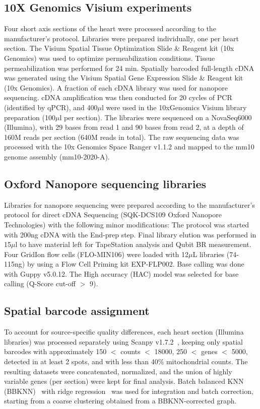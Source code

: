 \documentclass[utf8]{FrontiersinHarvard} %
\begin{document}
\subsection*{10X Genomics Visium experiments}
Four short axis sections of the heart were processed according to the manufacturer's protocol. Libraries were prepared individually, one per heart section. The Visium Spatial Tissue Optimization Slide \& Reagent kit (10x Genomics) was used to optimize permeabilization conditions. Tissue permeabilization was performed for 24 min. Spatially barcoded full-length cDNA was generated using the Visium Spatial Gene Expression Slide \& Reagent kit (10x Genomics). A fraction of each cDNA library was used for nanopore sequencing. cDNA amplification was then conducted for 20 cycles of PCR (identified by qPCR), and 400$\mu$l were used in the 10xGenomics Visium library preparation (100$\mu$l per section). The libraries were sequenced on a NovaSeq6000 (Illumina), with 29 bases from read 1 and 90 bases from read 2, at a depth of 160M reads per section (640M reads in total). The raw sequencing data was processed with the 10x Genomics Space Ranger v1.1.2 and mapped to the mm10 genome assembly (mm10-2020-A).

\subsection*{Oxford Nanopore sequencing libraries}
Libraries for nanopore sequencing were prepared according to the manufacturer's protocol for direct cDNA Sequencing (SQK-DCS109 Oxford Nanopore Technologies) with the following minor modifications: The protocol was started with 200ng cDNA with the End-prep step. Final library elution was performed in 15$\mu$l to have material left for TapeStation analysis and Qubit BR measurement. Four GridIon flow cells (FLO-MIN106) were loaded with 12$\mu$L libraries (74-115ng) by using a Flow Cell Priming kit EXP-FLP002. Base calling was done with Guppy v5.0.12. The High accuracy (HAC) model was selected for base calling (Q-Score cut-off $>$ 9).

\subsection*{Spatial barcode assignment}
To account for source-specific quality differences, each heart section (Illumina libraries) was processed separately using Scanpy v1.7.2~\citep{Wolf2018:scanpy}, keeping only spatial barcodes with approximately 150 $<$ counts $<$ 18000, 250 $<$ genes $<$ 5000, detected in at least 2 spots, and with less than 40\% mitochondrial counts. The resulting datasets were concatenated, normalized, and the union of highly variable genes (per section) were kept for final analysis. Batch balanced KNN (BBKNN)~\citep{Polanski2019:bbknn} with ridge regression~\citep{Park2020:thymic_atlas} was used for integration and batch correction, starting from a coarse clustering obtained from a BBKNN-corrected graph. 
\end{document}
